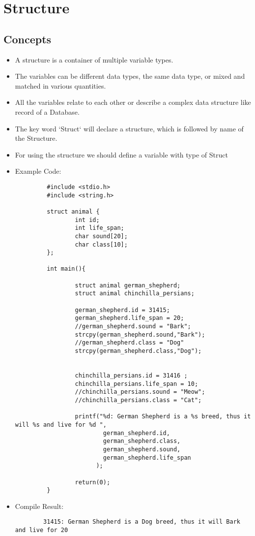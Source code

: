 \section{Structure}
\subsection{Concepts}

\begin{itemize}
    \item A structure is a container of multiple variable types.
    \item The variables can be different data types, the same data type, or mixed and matched in various quantities.
    \item All the variables relate to each other or describe a complex data structure like record of a Database.
    \item The key word `Struct` will declare a structure, which is followed by name of the Structure.
    \item For using the structure we should define a variable with type of Struct
        
    \break
    \item Example Code:
    \begin{lstlisting}
         #include <stdio.h>
         #include <string.h>
        
         struct animal {
                 int id;
                 int life_span;
                 char sound[20];
                 char class[10];
         };
        
         int main(){
        
                 struct animal german_shepherd;
                 struct animal chinchilla_persians;
        
                 german_shepherd.id = 31415;
                 german_shepherd.life_span = 20;
                 //german_shepherd.sound = "Bark";
                 strcpy(german_shepherd.sound,"Bark");
                 //german_shepherd.class = "Dog"
                 strcpy(german_shepherd.class,"Dog");
        
        
                 chinchilla_persians.id = 31416 ;
                 chinchilla_persians.life_span = 10;
                 //chinchilla_persians.sound = "Meow";
                 //chinchilla_persians.class = "Cat";
        
                 printf("%d: German Shepherd is a %s breed, thus it will %s and live for %d ",
                         german_shepherd.id,
                         german_shepherd.class,
                         german_shepherd.sound,
                         german_shepherd.life_span
                       );
        
                 return(0);
         }    
        \end{lstlisting}

    \item Compile Result:
    \begin{lstlisting}
        31415: German Shepherd is a Dog breed, thus it will Bark and live for 20
    \end{lstlisting}

\end{itemize}

